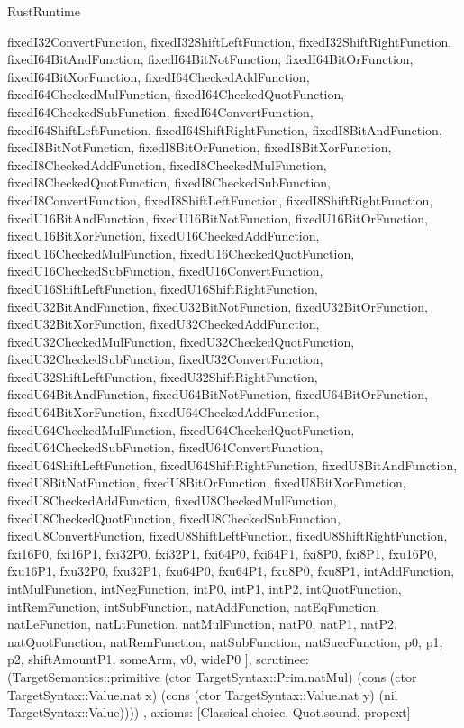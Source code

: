 \begin{lexlean}{RustRuntime}
\begin{semanticmodule}
{{      fixedI32ConvertFunction,
      fixedI32ShiftLeftFunction,
      fixedI32ShiftRightFunction,
      fixedI64BitAndFunction,
      fixedI64BitNotFunction,
      fixedI64BitOrFunction,
      fixedI64BitXorFunction,
      fixedI64CheckedAddFunction,
      fixedI64CheckedMulFunction,
      fixedI64CheckedQuotFunction,
      fixedI64CheckedSubFunction,
      fixedI64ConvertFunction,
      fixedI64ShiftLeftFunction,
      fixedI64ShiftRightFunction,
      fixedI8BitAndFunction,
      fixedI8BitNotFunction,
      fixedI8BitOrFunction,
      fixedI8BitXorFunction,
      fixedI8CheckedAddFunction,
      fixedI8CheckedMulFunction,
      fixedI8CheckedQuotFunction,
      fixedI8CheckedSubFunction,
      fixedI8ConvertFunction,
      fixedI8ShiftLeftFunction,
      fixedI8ShiftRightFunction,
      fixedU16BitAndFunction,
      fixedU16BitNotFunction,
      fixedU16BitOrFunction,
      fixedU16BitXorFunction,
      fixedU16CheckedAddFunction,
      fixedU16CheckedMulFunction,
      fixedU16CheckedQuotFunction,
      fixedU16CheckedSubFunction,
      fixedU16ConvertFunction,
      fixedU16ShiftLeftFunction,
      fixedU16ShiftRightFunction,
      fixedU32BitAndFunction,
      fixedU32BitNotFunction,
      fixedU32BitOrFunction,
      fixedU32BitXorFunction,
      fixedU32CheckedAddFunction,
      fixedU32CheckedMulFunction,
      fixedU32CheckedQuotFunction,
      fixedU32CheckedSubFunction,
      fixedU32ConvertFunction,
      fixedU32ShiftLeftFunction,
      fixedU32ShiftRightFunction,
      fixedU64BitAndFunction,
      fixedU64BitNotFunction,
      fixedU64BitOrFunction,
      fixedU64BitXorFunction,
      fixedU64CheckedAddFunction,
      fixedU64CheckedMulFunction,
      fixedU64CheckedQuotFunction,
      fixedU64CheckedSubFunction,
      fixedU64ConvertFunction,
      fixedU64ShiftLeftFunction,
      fixedU64ShiftRightFunction,
      fixedU8BitAndFunction,
      fixedU8BitNotFunction,
      fixedU8BitOrFunction,
      fixedU8BitXorFunction,
      fixedU8CheckedAddFunction,
      fixedU8CheckedMulFunction,
      fixedU8CheckedQuotFunction,
      fixedU8CheckedSubFunction,
      fixedU8ConvertFunction,
      fixedU8ShiftLeftFunction,
      fixedU8ShiftRightFunction,
      fxi16P0,
      fxi16P1,
      fxi32P0,
      fxi32P1,
      fxi64P0,
      fxi64P1,
      fxi8P0,
      fxi8P1,
      fxu16P0,
      fxu16P1,
      fxu32P0,
      fxu32P1,
      fxu64P0,
      fxu64P1,
      fxu8P0,
      fxu8P1,
      intAddFunction,
      intMulFunction,
      intNegFunction,
      intP0,
      intP1,
      intP2,
      intQuotFunction,
      intRemFunction,
      intSubFunction,
      natAddFunction,
      natEqFunction,
      natLeFunction,
      natLtFunction,
      natMulFunction,
      natP0,
      natP1,
      natP2,
      natQuotFunction,
      natRemFunction,
      natSubFunction,
      natSuccFunction,
      p0,
      p1,
      p2,
      shiftAmountP1,
      someArm,
      v0,
      wideP0
    ],
    scrutinee: (TargetSemantics::primitive (ctor TargetSyntax::Prim.natMul) (cons (ctor TargetSyntax::Value.nat x) (cons (ctor TargetSyntax::Value.nat y) (nil TargetSyntax::Value))))
  },
  axioms: [Classical.choice, Quot.sound, propext]
}


\end{semanticmodule}
\end{lexlean}
